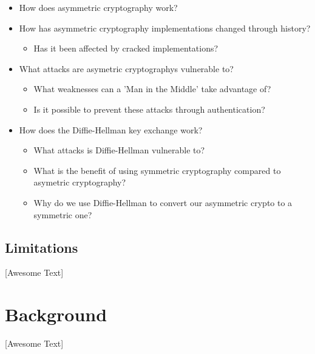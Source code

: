 \documentclass{acm_proc_article-sp}
\begin{document}
\begin{itemize}
    \item %
    How does asymmetric cryptography work?
    \item %
    How has asymmetric cryptography implementations changed through history?
    \begin{itemize}
        \item Has it been affected by cracked implementations?
    \end{itemize}
    
    \item %
    What attacks are asymetric cryptographys vulnerable to?
    \begin{itemize} 
        \item %
        What weaknesses can a 'Man in the Middle' take advantage of?
        \item %
        Is it possible to prevent these attacks through authentication?
    \end{itemize}
    
    \item %
    How does the Diffie-Hellman key exchange work?   
    \begin{itemize}
        \item %
        What attacks is Diffie-Hellman vulnerable to?
        \item %
        What is the benefit of using symmetric cryptography compared to asymetric cryptography?
        \item Why do we use Diffie-Hellman to convert our asymmetric crypto to a symmetric one?
    \end{itemize}
    
\end{itemize}

\subsection{Limitations}
[Awesome Text]

\section{Background}
[Awesome Text]
\end{document}
